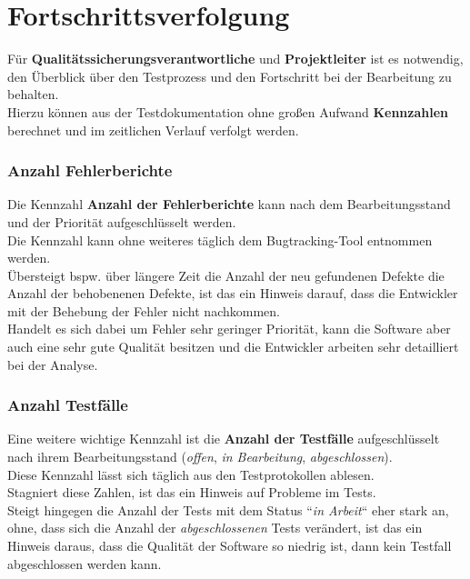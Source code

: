 \section{Fortschrittsverfolgung}
Für \textbf{Qualitätssicherungsverantwortliche} und \textbf{Projektleiter} ist es notwendig, den Überblick über den Testprozess und den Fortschritt bei der Bearbeitung zu behalten.\\
Hierzu können aus der Testdokumentation ohne großen Aufwand \textbf{Kennzahlen} berechnet und im zeitlichen Verlauf verfolgt werden.

\subsubsection*{Anzahl Fehlerberichte}
Die Kennzahl \textbf{Anzahl der Fehlerberichte} kann nach dem Bearbeitungsstand und der Priorität aufgeschlüsselt werden.\\
Die Kennzahl kann ohne weiteres täglich dem Bugtracking-Tool entnommen werden.\\
Übersteigt bspw. über längere Zeit die Anzahl der neu gefundenen Defekte die Anzahl der behobenenen Defekte, ist das ein Hinweis darauf, dass die Entwickler mit der Behebung der Fehler nicht nachkommen.\\
Handelt es sich dabei um Fehler sehr geringer Priorität, kann die Software aber auch eine sehr gute Qualität besitzen und die Entwickler arbeiten sehr detailliert bei der Analyse.

\subsubsection*{Anzahl Testfälle}
Eine weitere wichtige Kennzahl ist die \textbf{Anzahl der Testfälle} aufgeschlüsselt nach ihrem Bearbeitungsstand (\textit{offen}, \textit{in Bearbeitung}, \textit{abgeschlossen}).\\
Diese Kennzahl lässt sich täglich aus den Testprotokollen ablesen.\\
Stagniert diese Zahlen, ist das ein Hinweis auf Probleme im Tests.\\
Steigt hingegen die Anzahl der Tests mit dem Status ``\textit{in Arbeit}`` eher stark an, ohne, dass sich die Anzahl der \textit{abgeschlossenen} Tests verändert, ist das ein Hinweis daraus, dass die Qualität der Software so niedrig ist, dann kein Testfall abgeschlossen werden kann.